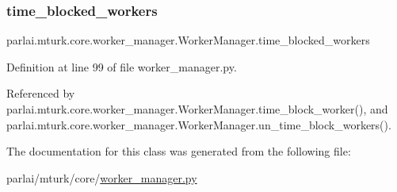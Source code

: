 \mbox{\label{classparlai_1_1mturk_1_1core_1_1worker__manager_1_1WorkerManager_aa51476aab479eae8096ae6097a8571f8}} 
\subsubsection{\texorpdfstring{time\+\_\+blocked\+\_\+workers}{time\_blocked\_workers}}
{\footnotesize\ttfamily parlai.\+mturk.\+core.\+worker\+\_\+manager.\+Worker\+Manager.\+time\+\_\+blocked\+\_\+workers}



Definition at line 99 of file worker\+\_\+manager.\+py.



Referenced by parlai.\+mturk.\+core.\+worker\+\_\+manager.\+Worker\+Manager.\+time\+\_\+block\+\_\+worker(), and parlai.\+mturk.\+core.\+worker\+\_\+manager.\+Worker\+Manager.\+un\+\_\+time\+\_\+block\+\_\+workers().



The documentation for this class was generated from the following file\+:\begin{DoxyCompactItemize}
\item 
parlai/mturk/core/\hyperlink{worker__manager_8py}{worker\+\_\+manager.\+py}\end{DoxyCompactItemize}
